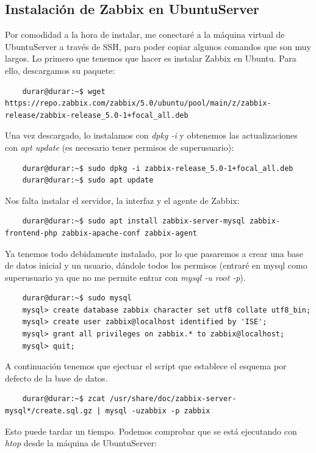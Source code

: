 \documentclass[a4paper]{article}
\begin{document}
\subsection{Instalación de Zabbix en UbuntuServer}
Por comodidad a la hora de instalar, me conectaré a la máquina virtual de UbuntuServer
a través de SSH, para poder copiar algunos comandos que son muy largos.\newline
Lo primero que tenemos que hacer es instalar Zabbix en Ubuntu. Para ello, 
descargamos su paquete:
\begin{lstlisting}
    durar@durar:~$ wget https://repo.zabbix.com/zabbix/5.0/ubuntu/pool/main/z/zabbix-release/zabbix-release_5.0-1+focal_all.deb
\end{lstlisting}
Una vez descargado, lo instalamos con \textsl{dpkg -i} y obtenemos las actualizaciones
con \textsl{apt update} (es necesario tener permisos de superusuario):
\begin{lstlisting}
    durar@durar:~$ sudo dpkg -i zabbix-release_5.0-1+focal_all.deb
    durar@durar:~$ sudo apt update
\end{lstlisting}
Nos falta instalar el servidor, la interfaz y el agente de Zabbix:
\begin{lstlisting}
    durar@durar:~$ sudo apt install zabbix-server-mysql zabbix-frontend-php zabbix-apache-conf zabbix-agent
\end{lstlisting}
Ya tenemos todo debidamente instalado, por lo que pasaremos a crear una base de 
datos inicial y un usuario, dándole todos los permisos (entraré en mysql como superusuario ya que no 
me permite entrar con \textsl{mysql -u root -p}).
\begin{lstlisting}
    durar@durar:~$ sudo mysql 
    mysql> create database zabbix character set utf8 collate utf8_bin;
    mysql> create user zabbix@localhost identified by 'ISE';
    mysql> grant all privileges on zabbix.* to zabbix@localhost;
    mysql> quit;
\end{lstlisting}
A continuación tenemos que ejectuar el script que establece el esquema por defecto de 
la base de datos.
\begin{lstlisting}
    durar@durar:~$ zcat /usr/share/doc/zabbix-server-mysql*/create.sql.gz | mysql -uzabbix -p zabbix
\end{lstlisting}
Esto puede tardar un tiempo. Podemos comprobar que se está ejecutando con \textsl{htop}
desde la máquina de UbuntuServer:
\end{document}
